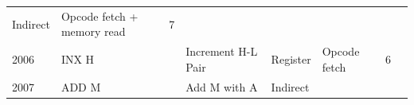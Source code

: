 \documentclass[11pt,twocolumn]{article}
\begin{document}
\begin{longtable}[]{@{}llllllll@{}}
\begin{minipage}[t]{0.09\columnwidth}
Indirect\strut
\end{minipage} & \begin{minipage}[t]{0.25\columnwidth}\raggedright
Opcode fetch + memory read\strut
\end{minipage} & \begin{minipage}[t]{0.05\columnwidth}\raggedright
7\strut
\end{minipage} & \begin{minipage}[t]{0.03\columnwidth}\raggedright
\strut
\end{minipage}\tabularnewline
\begin{minipage}[t]{0.04\columnwidth}\raggedright
2006\strut
\end{minipage} & \begin{minipage}[t]{0.05\columnwidth}\raggedright
INX H\strut
\end{minipage} & \begin{minipage}[t]{0.05\columnwidth}\raggedright
\strut
\end{minipage} & \begin{minipage}[t]{0.23\columnwidth}\raggedright
Increment H-L Pair\strut
\end{minipage} & \begin{minipage}[t]{0.09\columnwidth}\raggedright
Register\strut
\end{minipage} & \begin{minipage}[t]{0.25\columnwidth}\raggedright
Opcode fetch\strut
\end{minipage} & \begin{minipage}[t]{0.05\columnwidth}\raggedright
6\strut
\end{minipage} & \begin{minipage}[t]{0.03\columnwidth}\raggedright
\strut
\end{minipage}\tabularnewline
\begin{minipage}[t]{0.04\columnwidth}\raggedright
2007\strut
\end{minipage} & \begin{minipage}[t]{0.05\columnwidth}\raggedright
ADD M\strut
\end{minipage} & \begin{minipage}[t]{0.05\columnwidth}\raggedright
\strut
\end{minipage} & \begin{minipage}[t]{0.23\columnwidth}\raggedright
Add M with A\strut
\end{minipage} & \begin{minipage}[t]{0.09\columnwidth}\raggedright
Indirect\strut

\end{minipage}
\end{longtable}
\end{document}
